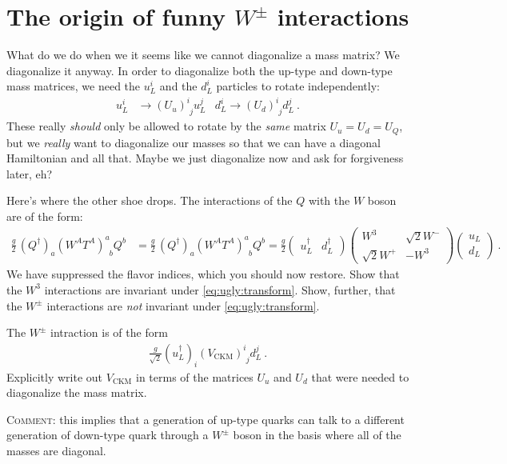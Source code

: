 \documentclass[12pt]{article}
\numberwithin{equation}{section}    %
\begin{document}
\section{The origin of funny $W^\pm$ interactions}

What do we do when we it seems like we cannot diagonalize a mass matrix? We diagonalize it anyway.  In order to diagonalize both the up-type and down-type mass matrices, we need the $u_L^i$ and the $d_L^i$ particles to rotate independently:
\begin{align}
	u_L^i &\to (U_u)^i_{\phantom i j} u_L^j
	&
	d_L^i \to (U_d)^i_{\phantom i j} d_L^j \ .
	\label{eq:ugly:transform}
\end{align}
These really \emph{should} only be allowed to rotate by the \emph{same} matrix $U_u = U_d = U_Q$, but we \emph{really} want to diagonalize our masses so that we can have a diagonal Hamiltonian and all that. Maybe we just diagonalize now and ask for forgiveness later, eh?

Here's where the other shoe drops. The interactions of the $Q$ with the $W$ boson are of the form:
\begin{align}
	\frac{g}{2} \, (Q^\dag)_a (W^A T^A)^a_{\phantom a b} Q^b
	&= 
	\frac{g}{2} \, (Q^\dag)_a (W^AT^A)^a_{\phantom a b} Q^b
	=
	\frac{g}{2}
	\begin{pmatrix}
		u_L^\dag & d_L^\dag
	\end{pmatrix}
	\begin{pmatrix}
		W^3 & \sqrt{2}W^-\\
		\sqrt{2}W^+ & -W^3
	\end{pmatrix}
	\begin{pmatrix}
		u_L \\ d_L
	\end{pmatrix} \ .
\end{align}
We have suppressed the flavor indices, which you should now restore. Show that the $W^3$ interactions are invariant under \eqref{eq:ugly:transform}. Show, further, that the $W^\pm$ interactions are \emph{not} invariant under \eqref{eq:ugly:transform}. 

The $W^\pm$ intraction is of the form
\begin{align}
	\frac{g}{\sqrt{2}} (u_L^\dag)_i (V_\text{CKM})^i_{\phantom i j} d_L^j \ .
\end{align}
Explicitly write out $V_\text{CKM}$ in terms of the matrices $U_u$ and $U_d$ that were needed to diagonalize the mass matrix. 

\textsc{Comment}: this implies that a generation of up-type quarks can talk to a different generation of down-type quark through a $W^\pm$ boson in the basis where all of the masses are diagonal.
\end{document}
